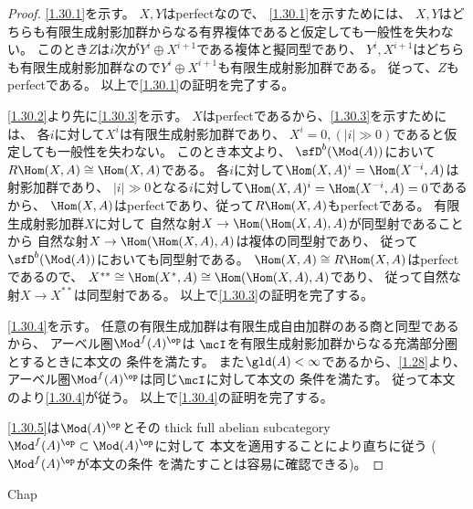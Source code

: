 \documentclass[uplatex,dvipdfmx]{jsarticle}
\begin{document}
\begin{proof}
  \ref{1.30.1}を示す。
  \(X,Y\)はperfectなので、
  \ref{1.30.1}を示すためには、
  \(X,Y\)はどちらも有限生成射影加群からなる有界複体であると仮定しても一般性を失わない。
  このとき\(Z\)は\(i\)次が\(Y^i\oplus X^{i+1}\)である複体と擬同型であり、
  \(Y^i,X^{i+1}\)はどちらも有限生成射影加群なので\(Y^i\oplus X^{i+1}\)も有限生成射影加群である。
  従って、\(Z\)もperfectである。
  以上で\ref{1.30.1}の証明を完了する。

  \ref{1.30.2}より先に\ref{1.30.3}を示す。
  \(X\)はperfectであるから、\ref{1.30.3}を示すためには、
  各\(i\)に対して\(X^i\)は有限生成射影加群であり、
  \(X^i=0, (|i| \gg 0)\)であると仮定しても一般性を失わない。
  このとき本文\cite[Proposition 1.10.4]{kashiwara2002sheaves}より、
  \(\sfD^b(\Mod(A))\)において\(R\Hom(X,A) \cong \Hom(X,A)\)である。
  各\(i\)に対して\(\Hom(X,A)^i = \Hom(X^{-i},A)\)は射影加群であり、
  \(|i|\gg 0\)となる\(i\)に対して\(\Hom(X,A)^i = \Hom(X^{-i},A) = 0\)であるから、
  \(\Hom(X,A)\)はperfectであり、従って\(R\Hom(X,A)\)もperfectである。
  有限生成射影加群\(X\)に対して
  自然な射\(X\to \Hom(\Hom(X,A),A)\)が同型射であることから
  自然な射\(X\to \Hom(\Hom(X,A),A)\)は複体の同型射であり、
  従って\(\sfD^b(\Mod(A))\)においても同型射である。
  \(\Hom(X,A)\cong R\Hom(X,A)\)はperfectであるので、
  \(X^{**}\cong \Hom(X^*,A)\cong \Hom(\Hom(X,A),A)\)であり、
  従って自然な射\(X\to X^{**}\)は同型射である。
  以上で\ref{1.30.3}の証明を完了する。

  \ref{1.30.4}を示す。
  任意の有限生成加群は有限生成自由加群のある商と同型であるから、
  アーベル圏\(\Mod^f(A)^{\op}\)は
  \(\mcI\)を有限生成射影加群からなる充満部分圏とするときに本文の
  条件\cite[(1.7.5)]{kashiwara2002sheaves}を満たす。
  また\(\gld(A) < \infty\)であるから、\autoref{1.28}より、
  アーベル圏\(\Mod^f(A)^{\op}\)は同じ\(\mcI\)に対して本文の
  条件\cite[(1.7.6)]{kashiwara2002sheaves}を満たす。
  従って本文の\cite[Corollary 1.7.8]{kashiwara2002sheaves}より\ref{1.30.4}が従う。
  以上で\ref{1.30.4}の証明を完了する。

  \ref{1.30.5}は\(\Mod(A)^{\op}\)とその
  thick full abelian subcategory
  \(\Mod^f(A)^{\op}\subset \Mod(A)^{\op}\)に対して
  本文\cite[Proposition 1.7.11]{kashiwara2002sheaves}を適用することにより直ちに従う
  (\(\Mod^f(A)^{\op}\)が本文\cite[Proposition 1.7.11]{kashiwara2002sheaves}の条件
  を満たすことは容易に確認できる)。
\end{proof}



\ifcsname Chap\endcsname\else
\printbibliography
\end{document}
